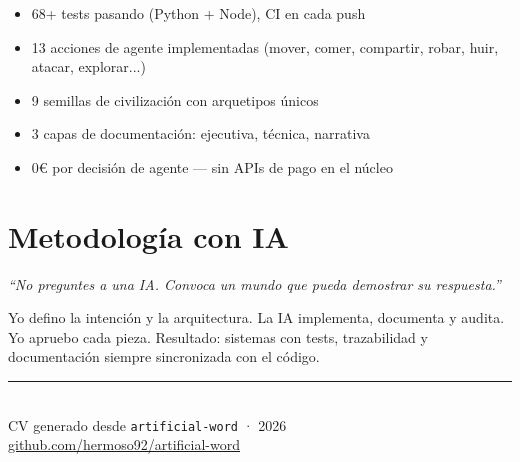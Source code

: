 \documentclass[10pt,a4paper]{article}
\begin{document}
\begin{itemize}[leftmargin=1.2em, itemsep=1pt, topsep=1pt]
  \item 68+ tests pasando (Python + Node), CI en cada push
  \item 13 acciones de agente implementadas (mover, comer, compartir, robar, huir, atacar, explorar...)
  \item 9 semillas de civilización con arquetipos únicos
  \item 3 capas de documentación: ejecutiva, técnica, narrativa
  \item 0€ por decisión de agente --- sin APIs de pago en el núcleo
\end{itemize}

\vspace{4pt}

\section*{Metodología con IA}

\textit{``No preguntes a una IA. Convoca un mundo que pueda demostrar su respuesta.''}

Yo defino la intención y la arquitectura. La IA implementa, documenta y audita. Yo apruebo cada pieza. Resultado: sistemas con tests, trazabilidad y documentación siempre sincronizada con el código.

\vspace{4pt}

\begin{center}
  \small\color{muted}
  \rule{0.5\linewidth}{0.3pt}\\[3pt]
  CV generado desde \texttt{artificial-word} · 2026\\
  \href{https://github.com/hermoso92/artificial-word}{github.com/hermoso92/artificial-word}
\end{center}
\end{document}

